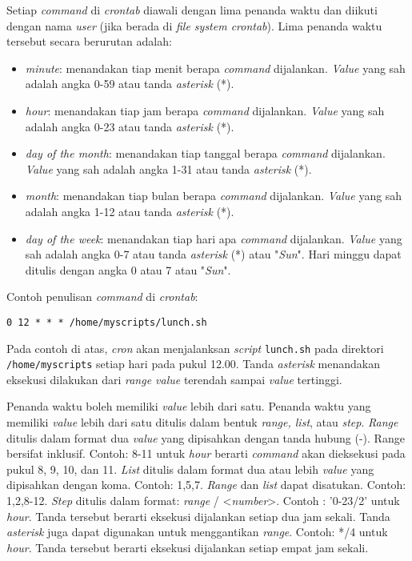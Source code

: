 Setiap \textit{command} di \textit{crontab} diawali dengan lima penanda waktu dan diikuti dengan nama \textit{user} (jika berada di \textit{file system crontab}). Lima penanda waktu tersebut secara berurutan adalah:
\begin{itemize}
\item \textit{minute}: menandakan tiap menit berapa \textit{command} dijalankan. \textit{Value} yang sah adalah angka 0-59 atau tanda \textit{asterisk} (*).
\item \textit{hour}: menandakan tiap jam berapa \textit{command} dijalankan. \textit{Value} yang sah adalah angka 0-23 atau tanda \textit{asterisk} (*).
\item \textit{day of the month}: menandakan tiap tanggal berapa \textit{command} dijalankan. \textit{Value} yang sah adalah angka 1-31 atau tanda \textit{asterisk} (*).
\item \textit{month}: menandakan tiap bulan berapa \textit{command} dijalankan. \textit{Value} yang sah adalah angka 1-12 atau tanda \textit{asterisk} (*).
\item \textit{day of the week}: menandakan tiap hari apa \textit{command} dijalankan. \textit{Value} yang sah adalah angka 0-7 atau tanda \textit{asterisk} (*) atau "\textit{Sun}". Hari minggu dapat ditulis dengan angka 0 atau 7 atau "\textit{Sun}".
\end{itemize}

Contoh penulisan \textit{command} di \textit{crontab}:
\begin{lstlisting}
0 12 * * * /home/myscripts/lunch.sh
\end{lstlisting}
Pada contoh di atas, \textit{cron} akan menjalanksan \textit{script} \texttt{lunch.sh} pada direktori \texttt{/home/myscripts} setiap hari pada pukul 12.00. Tanda \textit{asterisk} menandakan eksekusi dilakukan dari \textit{range value} terendah sampai \textit{value} tertinggi.

Penanda waktu boleh memiliki \textit{value} lebih dari satu. Penanda waktu yang memiliki \textit{value} lebih dari satu ditulis dalam bentuk \textit{range, list}, atau\textit{ step}. \textit{Range} ditulis dalam format dua \textit{value} yang dipisahkan dengan tanda hubung (-). Range bersifat inklusif. Contoh: 8-11 untuk \textit{hour} berarti \textit{command} akan dieksekusi pada pukul 8, 9, 10, dan 11. \textit{List} ditulis dalam format dua atau lebih \textit{value} yang dipisahkan dengan koma. Contoh: 1,5,7. \textit{Range} dan \textit{list} dapat disatukan. Contoh: 1,2,8-12. \textit{Step} ditulis dalam format: \textit{range} / <\textit{number}>. Contoh : '0-23/2' untuk \textit{hour}. Tanda tersebut berarti eksekusi dijalankan setiap dua jam sekali. Tanda \textit{asterisk} juga dapat digunakan untuk menggantikan \textit{range}. Contoh: */4 untuk \textit{hour}. Tanda tersebut berarti eksekusi dijalankan setiap empat jam sekali.

